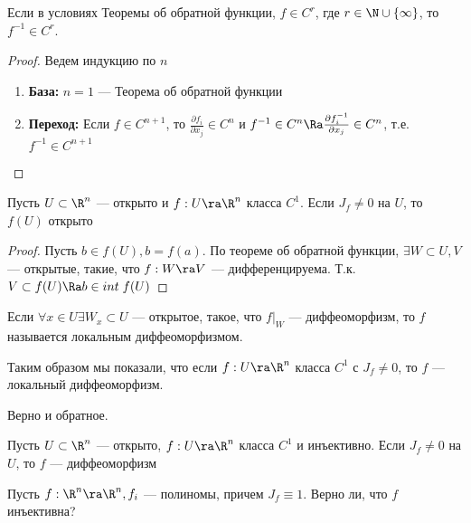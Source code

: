 
\begin{note}
    Если в условиях Теоремы об обратной функции, \(f \in C^r\), где \(r \in \N \cup \{\infty\}\), то \(f^{-1} \in C^r\).
\end{note}
\begin{proof}
    Ведем индукцию по \(n\)
    \begin{enumerate}
        \item[] \textbf{База:} \(n = 1\) --- Теорема об обратной функции
        \item[] \textbf{Переход:} Если \(f \in C^{n + 1}\), то \(\frac{\partial f_i}{\partial x_j} \in C^n\) и \(f^{-1} \in C^n \Ra \frac{\partial f^{-1}_i}{\partial x_j} \in C^n\), т.е. \(f^{-1} \in C^{n + 1}\)
    \end{enumerate}
\end{proof}

\begin{corollary}
    Пусть \(U \subset \R^n\) --- открыто и \(f: U \ra \R^n\) класса \(C^1\). Если \(J_f \ne 0\) на \(U\), то \(f(U)\) открыто
\end{corollary}
\begin{proof}
    Пусть \(b \in f(U), b = f(a)\). По теореме об обратной функции, \(\exists W \subset U, V\) --- открытые, такие, что \(f: W \ra V\) --- дифференцируема. Т.к. \(V \subset f(U) \Ra b \in int\;f(U)\)
\end{proof}

\begin{definition}
    Если \(\forall x \in U \exists W_x \subset U\) --- открытое, такое, что \(f|_W\) --- диффеоморфизм, то \(f\) называется локальным диффеоморфизмом.
\end{definition}

\begin{note}
    Таким образом мы показали, что если \(f: U \ra \R^n\) класса \(C^1\) с \(J_f \ne 0\), то \(f\) --- локальный диффеоморфизм.
\end{note}

\begin{note}
    Верно и обратное.
\end{note}

\begin{problem}
    Пусть \(U \subset \R^n\) --- открыто, \(f: U \ra \R^n\) класса \(C^1\) и инъективно. Если \(J_f \ne 0\) на \(U\), то \(f\) --- диффеоморфизм
\end{problem}

\begin{problem}
    Пусть \(f: \R^n \ra \R^n, f_i\) --- полиномы, причем \(J_f \equiv 1\). Верно ли, что \(f\) инъективна?
\end{problem}

